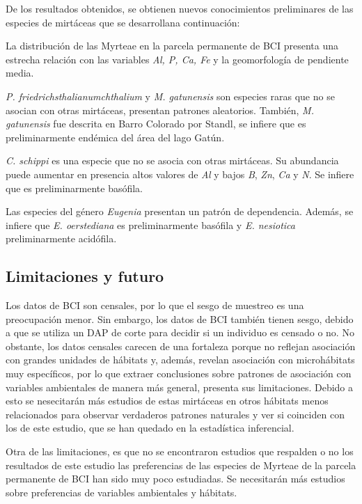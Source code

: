\documentclass[11pt,]{article}
\begin{document}
De los resultados obtenidos, se obtienen nuevos conocimientos
preliminares de las especies de mirtáceas que se desarrollana
continuación:

La distribución de las Myrteae en la parcela permanente de BCI presenta
una estrecha relación con las variables \emph{Al, P, Ca, Fe} y la
geomorfología de pendiente media.

\emph{P. friedrichsthalianumchthalium} y \emph{M. gatunensis} son
especies raras que no se asocian con otras mirtáceas, presentan patrones
aleatorios. También, \emph{M. gatunensis} fue descrita en Barro Colorado
por Standl, se infiere que es preliminarmente endémica del área del lago
Gatún.

\emph{C. schippi} es una especie que no se asocia con otras mirtáceas.
Su abundancia puede aumentar en presencia altos valores de \emph{Al} y
bajos \emph{B}, \emph{Zn}, \emph{Ca} y \emph{N}. Se infiere que es
preliminarmente basófila.

Las especies del género \emph{Eugenia} presentan un patrón de
dependencia. Además, se infiere que \emph{E. oerstediana} es
preliminarmente basófila y \emph{E. nesiotica} preliminarmente
acidófila.

\subsection{Limitaciones y futuro}\label{limitaciones-y-futuro}

Los datos de BCI son censales, por lo que el sesgo de muestreo es una
preocupación menor. Sin embargo, los datos de BCI también tienen sesgo,
debido a que se utiliza un DAP de corte para decidir si un individuo es
censado o no. No obstante, los datos censales carecen de una fortaleza
porque no reflejan asociación con grandes unidades de hábitats y,
además, revelan asociación con microhábitats muy específicos, por lo que
extraer conclusiones sobre patrones de asociación con variables
ambientales de manera más general, presenta sus limitaciones. Debido a
esto se nesecitarán más estudios de estas mirtáceas en otros hábitats
menos relacionados para observar verdaderos patrones naturales y ver si
coinciden con los de este estudio, que se han quedado en la estadística
inferencial.

Otra de las limitaciones, es que no se encontraron estudios que
respalden o no los resultados de este estudio las preferencias de las
especies de Myrteae de la parcela permanente de BCI han sido muy poco
estudiadas. Se necesitarán más estudios sobre preferencias de variables
ambientales y hábitats.
\end{document}
